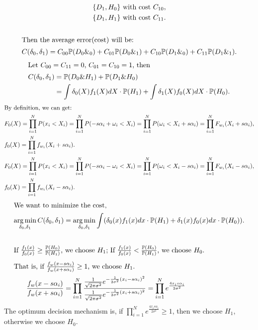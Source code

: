 \documentclass[letter, 12pt]{article}
\DeclareMathOperator*{\argmin}{arg\,min}
\begin{document}
\begin{enumerate}[wide = 0pt, label = \textbf{Problem \arabic*:}]
\begin{subquestion}
\begin{gather*}
					 \lbrace D_1, H_0 \rbrace \text{ with cost } C_{10}, \\
					 \lbrace D_1, H_1 \rbrace \text{ with cost } C_{11}. \\
					 \\
					 \shortintertext{Then the average error(cost) will be:} 
					 C(\delta_0, \delta_1) = C_{00}\mathbb{P}(D_0\&_0) + C_{01}\mathbb{P}(D_0\&_1) + C_{10}\mathbb{P}(D_1\&_0) + C_{11}\mathbb{P}(D_1\&_1). 
				\end{gather*}
				\begin{align*}
					\shortintertext{Let $ C_{00} = C_{11} = 0$, $ C_{01} = C_{10} = 1 $, then} 
					C(\delta_0, \delta_1) &=  \mathbb{P}(D_0 \& H_1) + \mathbb{P}(D_1 \& H_0) \\
					&= \int\delta_0(X)f_1(X)dX \cdot \mathbb{P}(H_1) + \int\delta_1(X)f_0(X)dX \cdot \mathbb{P}(H_0). 
				\end{align*}
				\begin{align*}
					\shortintertext{By definition, we can get:} 
					&F_0(X) = \prod_{i=1}^{N}P(x_i < X_i) = \prod_{i=1}^{N}P(-s\alpha_i + \omega_i < X_i) = \prod_{i=1}^{N}P(\omega_i< X_i +s\alpha_i) = \prod_{i=1}^{N}F_{w_i}(X_i + s\alpha_i) ,\\
					&f_0(X) = \prod_{i=1}^{N}f_{w_i}(X_i + s\alpha_i) .\\
					&F_0(X) = \prod_{i=1}^{N}P(x_i < X_i) = \prod_{i=1}^{N}P(-s\alpha_i - \omega_i < X_i) = \prod_{i=1}^{N}P(\omega_i< X_i -s\alpha_i) = \prod_{i=1}^{N}F_{w_i}(X_i - s\alpha_i) ,\\
					&f_0(X) = \prod_{i=1}^{N}f_{w_i}(X_i - s\alpha_i) .
				\end{align*}
				\begin{align*}
					\shortintertext{We want to minimize the cost, }
					\argmin_{\delta_0, \delta_1} C(\delta_0, \delta_1) &= \argmin_{\delta_0, \delta_1} \int(\delta_0(x)f_1(x)dx \cdot \mathbb{P}(H_1) + \delta_1(x)f_0(x)dx \cdot \mathbb{P}(H_0)). \\
					\\
					\shortintertext{If $ \frac{f_1(x)}{f_0(x)} \ge \frac{\mathbb{P}(H_0)}{\mathbb{P}(H_1)} $, we choose $ H_1 $; If $ \frac{f_1(x)}{f_0(x)} < \frac{\mathbb{P}(H_0)}{\mathbb{P}(H_1)} $, we choose $ H_0 $.}
					\shortintertext{That is, if $ \frac{f_w(x - s\alpha_i)}{f_w(x + s\alpha_i)} \ge 1 $, we choose $ H_1 $.}
					\frac{f_w(x - s\alpha_i)}{f_w(x + s\alpha_i)} &= \prod_{i=1}^{N} \frac{\frac{1}{\sqrt{2\pi\sigma^2}}e^{-\frac{1}{2\sigma^2}(x_i - s\alpha_i)^2}}{\frac{1}{\sqrt{2\pi\sigma^2}}e^{-\frac{1}{2\sigma^2}(x_i + s\alpha_i)^2}} = \prod_{i=1}^{N} e^{\frac{4x_i s\alpha_i}{2\sigma^2}}
				\end{align*}
			The optimum decision mechanism is, if $ \prod_{i=1}^{N} e^{\frac{4x_i s\alpha_i}{2\sigma^2}} \ge 1 $, then we choose $ H_1 $, otherwise we choose $ H_0 $. \\
			

\end{subquestion}
\end{enumerate}
\end{document}
